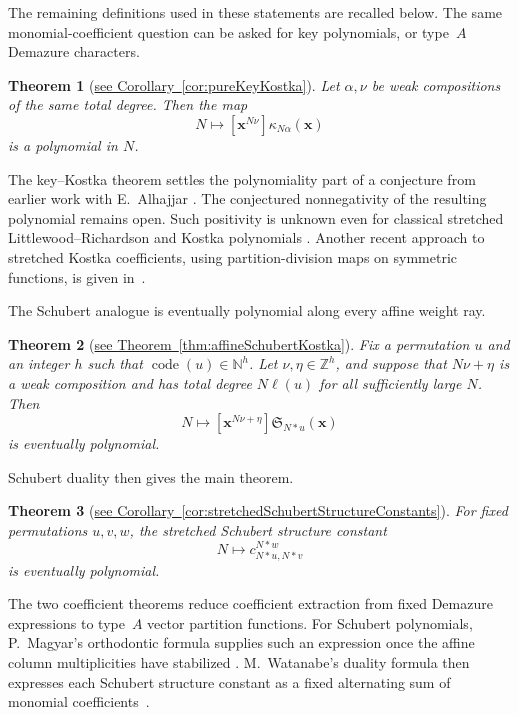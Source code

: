 \documentclass[11pt,reqno]{amsart}
\newtheorem*{introtheorem}{Theorem}
\theoremstyle{definition}
\DeclareMathOperator{\code}{code}
\newcommand{\setN}{\mathbb{N}}
\newcommand{\setZ}{\mathbb{Z}}
\newcommand{\xvec}{\mathbf{x}}
\newcommand{\schubertS}{\mathfrak{S}}
\newcommand{\keypoly}{\kappa}
\newcommand{\stretchop}{\mathbin{\ast}}
\newcommand{\stretchperm}[2]{#1\stretchop #2}
\begin{document}
The remaining definitions used in these statements are recalled below.  The
same monomial-coefficient question can be asked for key polynomials, or
type~\(A\) Demazure characters.

\begin{introtheorem}[{\hyperref[cor:pureKeyKostka]
  {see Corollary~\ref*{cor:pureKeyKostka}}}]
  Let \(\alpha,\nu\) be weak compositions of the same total degree.
  Then the map
\[
N\longmapsto
[\xvec^{N\nu}]\keypoly_{N\alpha}(\xvec)
\]
is a polynomial in \(N\).
\end{introtheorem}

The key--Kostka theorem settles the polynomiality part of a
conjecture from earlier work with E.~Alhajjar
\cite[Conj.~5.1]{AlexanderssonAlhajjar2018}.  The conjectured nonnegativity of
the resulting polynomial remains open.  Such positivity is unknown even for
classical stretched Littlewood--Richardson and Kostka polynomials
\cite{KingTolluToumazet2004}.  Another recent approach to stretched Kostka
coefficients, using partition-division maps on symmetric functions, is given
in~\cite{AlexanderssonDai2026x}.

The Schubert analogue is eventually polynomial along every affine weight ray.

\begin{introtheorem}[{\hyperref[thm:affineSchubertKostka]
  {see Theorem~\ref*{thm:affineSchubertKostka}}}]
Fix a permutation \(u\) and an integer \(h\) such that
\(\code(u)\in\setN^h\).  Let \(\nu,\eta\in\setZ^h\), and suppose that
\(N\nu+\eta\) is a weak composition and has total degree \(N\ell(u)\) for all
sufficiently large \(N\).  Then
\[
N\longmapsto
[\xvec^{N\nu+\eta}]\schubertS_{\stretchperm{N}{u}}(\xvec)
\]
is eventually polynomial.
\end{introtheorem}

Schubert duality then gives the main theorem.

\begin{introtheorem}[{\hyperref[cor:stretchedSchubertStructureConstants]
  {see Corollary~\ref*{cor:stretchedSchubertStructureConstants}}}]
For fixed permutations \(u,v,w\), the stretched Schubert structure constant
\[
N\longmapsto
c_{\stretchperm{N}{u},\stretchperm{N}{v}}^{\stretchperm{N}{w}}
\]
is eventually polynomial.
\end{introtheorem}

The two coefficient theorems reduce coefficient extraction from fixed Demazure
expressions to type~\(A\) vector partition functions.  For Schubert
polynomials, P.~Magyar's orthodontic formula supplies such an expression once
the affine column multiplicities have stabilized
\cite[Prop.~15]{Magyar1998SchubertBottSamelson}.  M.~Watanabe's duality formula
then expresses each Schubert structure constant as a fixed alternating sum of
monomial coefficients~\cite[Lem.~7.4]{Watanabe2016}.
\end{document}
